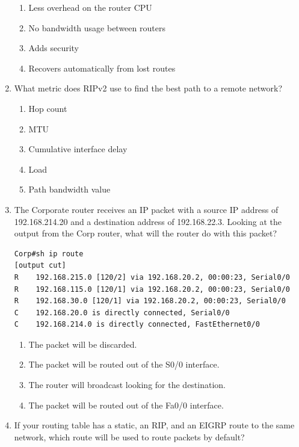 \begin{enumerate}
  \begin{enumerate}
  \tightlist
  \item
    Less overhead on the router CPU
  \item
    No bandwidth usage between routers
  \item
    Adds security
  \item
    Recovers automatically from lost routes
  \end{enumerate}
\item
  What metric does RIPv2 use to find the best path to a remote network?

  \begin{enumerate}
  \tightlist
  \item
    Hop count
  \item
    MTU
  \item
    Cumulative interface delay
  \item
    Load
  \item
    Path bandwidth value
  \end{enumerate}
\item
  The Corporate router receives an IP packet with a source IP address of
  192.168.214.20 and a destination address of 192.168.22.3. Looking at
  the output from the Corp router, what will the router do with this
  packet?

\begin{verbatim}
Corp#sh ip route
[output cut]
R    192.168.215.0 [120/2] via 192.168.20.2, 00:00:23, Serial0/0
R    192.168.115.0 [120/1] via 192.168.20.2, 00:00:23, Serial0/0
R    192.168.30.0 [120/1] via 192.168.20.2, 00:00:23, Serial0/0
C    192.168.20.0 is directly connected, Serial0/0
C    192.168.214.0 is directly connected, FastEthernet0/0
\end{verbatim}

  \begin{enumerate}
  \tightlist
  \item
    The packet will be discarded.
  \item
    The packet will be routed out of the S0/0 interface.
  \item
    The router will broadcast looking for the destination.
  \item
    The packet will be routed out of the Fa0/0 interface.
  \end{enumerate}
\item
  If your routing table has a static, an RIP, and an EIGRP route to the
  same network, which route will be used to route packets by default?


\end{enumerate}
